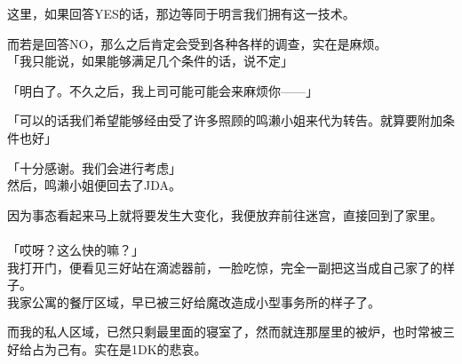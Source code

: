 这里，如果回答YES的话，那边等同于明言我们拥有这一技术。

而若是回答NO，那么之后肯定会受到各种各样的调查，实在是麻烦。\\

「我只能说，如果能够满足几个条件的话，说不定」

「明白了。不久之后，我上司可能可能会来麻烦你——」

「可以的话我们希望能够经由受了许多照顾的鸣濑小姐来代为转告。就算要附加条件也好」

「十分感谢。我们会进行考虑」\\

然后，鸣濑小姐便回去了JDA。

因为事态看起来马上就将要发生大变化，我便放弃前往迷宫，直接回到了家里。\\

\sqsplit\\

「哎呀？这么快的嘛？」\\

我打开门，便看见三好站在滴滤器前，一脸吃惊，完全一副把这当成自己家了的样子。\\

我家公寓的餐厅区域，早已被三好给魔改造成小型事务所的样子了。

而我的私人区域，已然只剩最里面的寝室了，然而就连那屋里的被炉，也时常被三好给占为己有。实在是1DK的悲哀。\\

